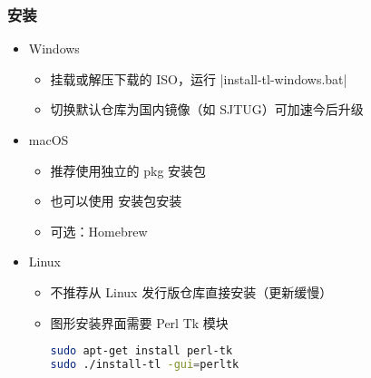 \begin{frame}[fragile]
  \frametitle{安装}
  \begin{itemize}
    \item Windows
          \begin{itemize}
            \item 挂载或解压下载的 ISO，运行 |install-tl-windows.bat|
            \item 切换默认仓库为国内镜像（如 SJTUG）可加速今后升级
          \end{itemize}
    \item macOS
          \begin{itemize}
            \item 推荐使用独立的 pkg 安装包 
            \item 也可以使用 \TL 安装包安装 
            \item 可选：Homebrew 
          \end{itemize}
    \item Linux
          \begin{itemize}
            \item 不推荐从 Linux 发行版仓库直接安装（更新缓慢）
            \item 图形安装界面需要 Perl Tk 模块
                  \begin{lstlisting}[language=bash]
sudo apt-get install perl-tk
sudo ./install-tl -gui=perltk
        \end{lstlisting}
          \end{itemize}
  \end{itemize}
\end{frame}

